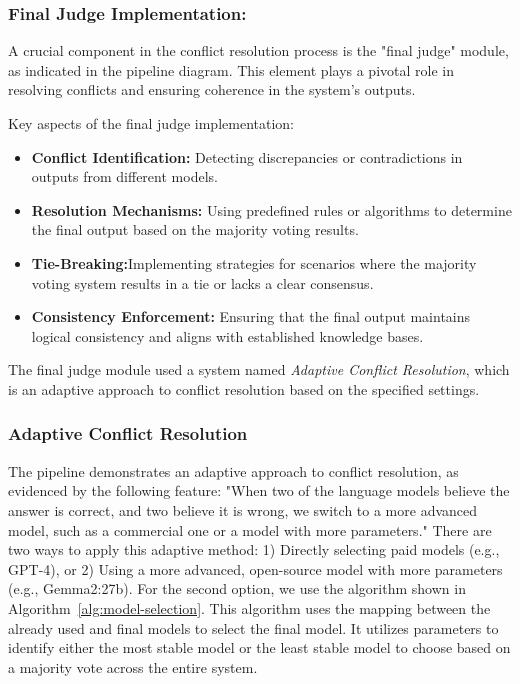 \subsubsection{Final Judge Implementation:}
A crucial component in the conflict resolution process is the "final judge" module, as indicated in the pipeline diagram.
This element plays a pivotal role in resolving conflicts and ensuring coherence in the system's outputs.

Key aspects of the final judge implementation:
\begin{itemize}
    \item \textbf{Conflict Identification:} Detecting discrepancies or contradictions in outputs from different models.
    \item \textbf{Resolution Mechanisms:} Using predefined rules or algorithms to determine the final output based on the majority voting results.
    \item \textbf{Tie-Breaking:}Implementing strategies for scenarios where the majority voting system results in a tie or lacks a clear consensus.
    \item \textbf{Consistency Enforcement:} Ensuring that the final output maintains logical consistency and aligns with established knowledge bases.
\end{itemize}

The final judge module used a system named \textit{Adaptive Conflict Resolution}, which is an adaptive approach to conflict resolution based on the specified settings.

\subsubsection{Adaptive Conflict Resolution}
The pipeline demonstrates an adaptive approach to conflict resolution, as evidenced by the following feature:
"When two of the language models believe the answer is correct, and two believe it is wrong, we switch to a more advanced model, such as a commercial one or a model with more parameters."
There are two ways to apply this adaptive method: 1) Directly selecting paid models (e.g., GPT-4), or 2) Using a more advanced, open-source model with more parameters (e.g., Gemma2:27b).
For the second option, we use the algorithm shown in Algorithm~\ref{alg:model-selection}.
This algorithm uses the mapping between the already used and final models to select the final model.
It utilizes parameters to identify either the most stable model or the least stable model to choose based on a majority vote across the entire system.


